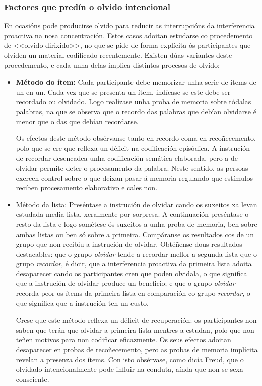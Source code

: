 \documentclass[a4paper,11pt]{article}
\begin{document}
\subsubsection{Factores que predín o olvido intencional}
En ocasións pode producirse olvido para reducir as interrupcións da interferencia proactiva na nosa concentración. Estos casos adoitan estudarse co procedemento de <<olvido dirixido>>, no que se pide de forma explícita ós participantes que olviden un material codificado recentemente. Existen dúas variantes deste procedemento, e cada unha delas implica distintos procesos de olvido:
\begin{itemize}
	\item \textbf{Método do ítem:} Cada participante debe memorizar unha serie de ítems de un en un. 
	Cada vez que se presenta un ítem, indícase se este debe ser recordado ou olvidado. Logo 
	realízase unha proba de memoria sobre tódalas palabras, na que se observa que o recordo das 
	palabras que debían olvidarse é menor que o das que debían recordarse.
	
	Os efectos deste método obsérvanse tanto en recordo coma en recoñecemento, polo que se cre que 
	reflexa un déficit na codificación episódica. A instrución de recordar desencadea unha 
	codificación semática elaborada, pero a de olvidar permite deter o procesamento da palabra. 
	Neste sentido, as persoas exercen control sobre o que deixan pasar á memoria regulando que 
	estímulos reciben procesamento elaborativo e cales non.
	\item \underline{Método da lista}: Preséntase a instrución de olvidar cando os suxeitos xa levan 
	estudada media lista, xeralmente por sorpresa. A continuación preséntase o resto da lista e logo 
	sométese ós suxeitos a unha proba de memoria, ben sobre ambas listas ou ben só sobre a primeira. 
	Compáranse os resultados cos de un grupo que non recibiu a instrución de olvidar. Obtéñense dous 
	resultados destacables: que o grupo \textit{olvidar} tende a recordar mellor a segunda lista que 
	o grupo \textit{recordar}, é dicir, que a interferencia proactiva da primeira lista adoita 
	desaparecer cando os participantes cren que poden olvidala, o que significa que a instrución de 
	olvidar produce un beneficio; e que o grupo \textit{olvidar} recorda peor os ítems da primeira 
	lista en comparación co grupo \textit{recordar}, o que significa que a instrución ten un custo. 
	
	Crese que este método reflexa un déficit de recuperación: os participantes non saben que terán 
	que olvidar a primeira lista mentres a estudan, polo que non teñen motivos para non codificar 
	eficazmente. Os seus efectos adoitan desaparecer en probas de recoñecemento, pero as probas de 
	memoria implícita revelan a presenza dos ítems. Con isto obsérvase, como dicía Freud, que o 
	olvidado intencionalmente pode influir na conduta, aínda que non se sexa consciente.
	

\end{itemize}
\end{document}
